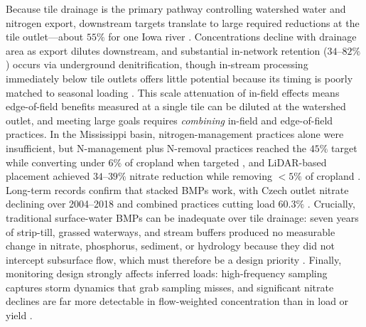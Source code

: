 \documentclass[11pt]{article}
\begin{document}
Because tile drainage is the primary pathway controlling watershed water and
nitrogen export, downstream targets translate to large required reductions at
the tile outlet---about $55\%$ for one Iowa river
\parencite{Schilling2012b,Ikenberry2014}. Concentrations decline with drainage
area as export dilutes downstream, and substantial in-network retention
($34$--$82\%$) occurs via underground denitrification, though in-stream
processing immediately below tile outlets offers little potential because its
timing is poorly matched to seasonal loading
\parencite{Schilling2012b,Billy2011,Billy2013}. This scale attenuation of
in-field effects means edge-of-field benefits measured at a single tile can be
diluted at the watershed outlet, and meeting large goals requires
\emph{combining} in-field and edge-of-field practices. In the Mississippi
basin, nitrogen-management practices alone were insufficient, but N-management
plus N-removal practices reached the $45\%$ target while converting under
$6\%$ of cropland when targeted \parencite{McLellan2015}, and LiDAR-based
placement achieved $34$--$39\%$ nitrate reduction while removing $<5\%$ of
cropland \parencite{Tomer2015,Kvítek2023}. Long-term records confirm that
stacked BMPs work, with Czech outlet nitrate declining over 2004--2018 and
combined practices cutting load $60.3\%$
\parencite{Fraindová2022,Law2022}. Crucially, traditional surface-water BMPs
can be inadequate over tile drainage: seven years of strip-till, grassed
waterways, and stream buffers produced no measurable change in nitrate,
phosphorus, sediment, or hydrology because they did not intercept subsurface
flow, which must therefore be a design priority \parencite{Lemke2011}.
Finally, monitoring design strongly affects inferred loads: high-frequency
sampling captures storm dynamics that grab sampling misses, and significant
nitrate declines are far more detectable in flow-weighted concentration than
in load or yield \parencite{Drake2018,Danalatos2022,Irvine2019}.

\printbibliography
\end{document}
